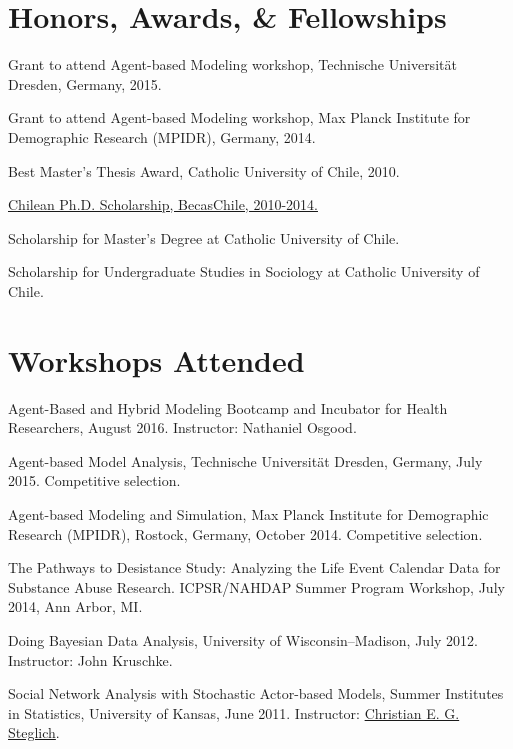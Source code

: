 \documentclass[10pt,letterpaper]{article}
\renewenvironment{itemize}{
  \begin{list}{}{
    \setlength{\leftmargin}{1.5em}
    \setlength{\itemsep}{0.25em}
    \setlength{\parskip}{0pt}
    \setlength{\parsep}{0.25em}
  }
}{
  \end{list}
}
\begin{document}
\section*{Honors, Awards, \& Fellowships}

\begin{itemize}
\item Grant to attend Agent-based Modeling workshop, Technische Universität Dresden, Germany, 2015.
\item Grant to attend Agent-based Modeling workshop, Max Planck Institute for Demographic Research (MPIDR), Germany, 2014.
\item Best Master's Thesis Award, Catholic University of Chile, 2010.
\item \href{http://www.becaschile.cl}{Chilean Ph.D. Scholarship, BecasChile, 2010-2014.}
\item Scholarship for Master’s Degree at Catholic University of Chile.
\item Scholarship for Undergraduate Studies in Sociology at Catholic University of Chile.
\end{itemize}

\section*{Workshops Attended}

\begin{itemize}


\item Agent-Based and Hybrid Modeling Bootcamp and Incubator for Health Researchers, August 2016. Instructor: Nathaniel Osgood.
\item Agent-based Model Analysis, Technische Universität Dresden, Germany, July 2015. Competitive selection.
\item Agent-based Modeling and Simulation, Max Planck Institute for Demographic Research (MPIDR), Rostock, Germany, October 2014. Competitive selection.
\item The Pathways to Desistance Study: Analyzing the Life Event Calendar Data for Substance Abuse Research. ICPSR/NAHDAP Summer Program Workshop, July 2014, Ann Arbor, MI.
\item Doing Bayesian Data Analysis, University of Wisconsin--Madison, July 2012. Instructor: John Kruschke.
\item Social Network Analysis with Stochastic Actor-based Models, Summer Institutes in Statistics,  University of Kansas, June 2011. Instructor: \href{http://www.ppsw.rug.nl/~steglich/sites/index.htm}{Christian E. G. Steglich}.

 \end{itemize}
\end{document}
